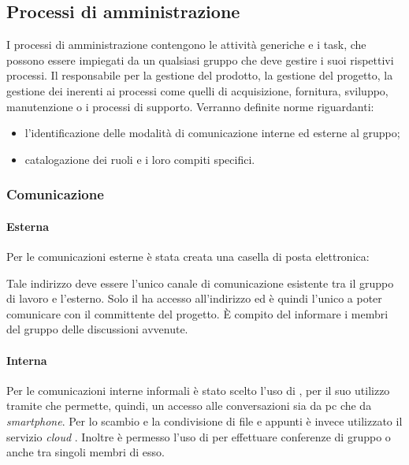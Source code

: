 \documentclass[12pt,a4paper]{article}
\begin{document}
\subsection{Processi di amministrazione}
I processi di amministrazione contengono le attività generiche e i task, che possono essere impiegati da un qualsiasi gruppo che deve gestire i suoi rispettivi processi. Il \PM{} responsabile per la gestione del prodotto, la gestione del progetto, la gestione dei \textit{} inerenti ai processi come quelli di acquisizione, fornitura, sviluppo, manutenzione o i processi di supporto. Verranno definite norme riguardanti:
\begin{itemize}
	\item l'identificazione delle modalità di comunicazione interne ed esterne al gruppo;
	\item catalogazione dei ruoli e i loro compiti specifici.
\end{itemize}

\subsubsection{Comunicazione}
\paragraph{Esterna}
Per le comunicazioni esterne è stata creata una casella di posta elettronica:
\begin{center}
	\href{mailto:\mailGruppo{}}{\mailGruppo{}}
\end{center}
Tale indirizzo deve essere l'unico canale di comunicazione esistente tra il gruppo di lavoro e l'esterno. Solo il \PM{} ha accesso all'indirizzo ed è quindi l'unico a poter comunicare con il committente del progetto. È compito del \PM{} informare i membri del gruppo delle discussioni avvenute.

\paragraph{Interna}
Per le comunicazioni interne informali è stato scelto l'uso di \textit{}, per il suo utilizzo tramite \textit{} che permette, quindi, un accesso alle conversazioni sia da pc che da \textit{smartphone}. Per lo scambio e la condivisione di file e appunti è invece utilizzato il servizio \textit{cloud} . Inoltre è permesso l'uso di  per effettuare conferenze di gruppo o anche tra singoli membri di esso.
\end{document}
